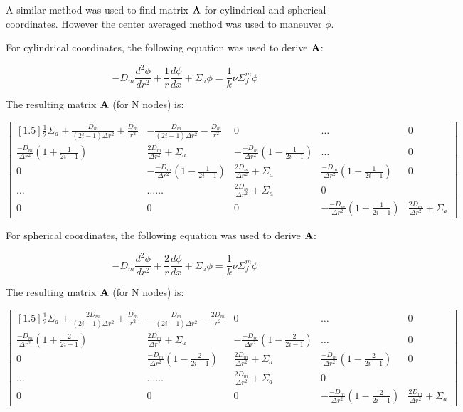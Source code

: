 \documentclass[../main.tex]{subfiles}
\begin{document}
A similar method was used to find matrix $\mathbf{A}$ for cylindrical and spherical coordinates.  However the center averaged method was used to maneuver $\phi$.

For cylindrical coordinates, the following equation was used to derive $\mathbf{A}$:

\begin{equation*}
		-D_m \frac{d^2 \phi}{d r^2} + \frac{1}{r} \frac{d \phi}{dx} + \Sigma_a \phi =   \frac{1}{k} \nu \Sigma^m_f \phi
	\end{equation*}
	
The resulting matrix $\mathbf{A}$ (for N nodes) is:

\[
	\begin{bmatrix}[1.5]
		\frac{1}{2} \Sigma_a + \frac{D_m}{(2i-1)\Delta r^2} +\frac{D_m}{r^2} & -\frac{D_m}{(2i-1)\Delta r^2} - \frac{D_m}{r^2} & 0 & \dots & 0 \\
		\frac{-D_m}{\Delta r^2} \left( 1 + \frac{1}{2i-1} \right) & \frac{2D_m}{\Delta r^2} + \Sigma_a & - \frac{-D_m}{\Delta r^2} \left( 1 - \frac{1}{2i-1} \right) & \dots & 0 \\
		0 & - \frac{-D_m}{\Delta r^2} \left( 1 - \frac{1}{2i-1} \right) & \frac{2D_m}{\Delta r^2} + \Sigma_a & \frac{-D_m}{\Delta r^2} \left( 1 - \frac{1}{2i-1} \right) & 0\\
		\dots & \dots \dots & \frac{2D_m}{\Delta r^2} + \Sigma_a & 0 \\
		0 & 0 & 0 & -\frac{-D_m}{\Delta r^2} \left( 1 - \frac{1}{2i-1} \right) & \frac{2D_m}{\Delta r^2} + \Sigma_a
	\end{bmatrix}
	\]

For spherical coordinates, the following equation was used to derive $\mathbf{A}$:

\begin{equation*}
		-D_m \frac{d^2 \phi}{d r^2} + \frac{2}{r} \frac{d \phi}{dx} + \Sigma_a \phi =   \frac{1}{k} \nu \Sigma^m_f \phi
	\end{equation*}

The resulting matrix $\mathbf{A}$ (for N nodes) is:

\[
	\begin{bmatrix}[1.5]
		\frac{1}{2} \Sigma_a + \frac{2 D_m}{(2i-1)\Delta r^2} +\frac{D_m}{r^2} & -\frac{D_m}{(2i-1)\Delta r^2} - \frac{2 D_m}{r^2} & 0 & \dots & 0 \\
		\frac{-D_m}{\Delta r^2} \left( 1 + \frac{2}{2i-1} \right) & \frac{2D_m}{\Delta r^2} + \Sigma_a & - \frac{-D_m}{\Delta r^2} \left( 1 - \frac{2}{2i-1} \right) & \dots & 0 \\
		0 & \frac{-D_m}{\Delta r^2} \left( 1 - \frac{2}{2i-1} \right) & \frac{2D_m}{\Delta r^2} + \Sigma_a & \frac{-D_m}{\Delta r^2} \left( 1 - \frac{2}{2i-1} \right) & 0\\
		\dots & \dots \dots & \frac{2D_m}{\Delta r^2} + \Sigma_a & 0 \\
		0 & 0 & 0 & -\frac{-D_m}{\Delta r^2} \left( 1 - \frac{2}{2i-1} \right) & \frac{2D_m}{\Delta r^2} + \Sigma_a
	\end{bmatrix}
	\]
\end{document}
